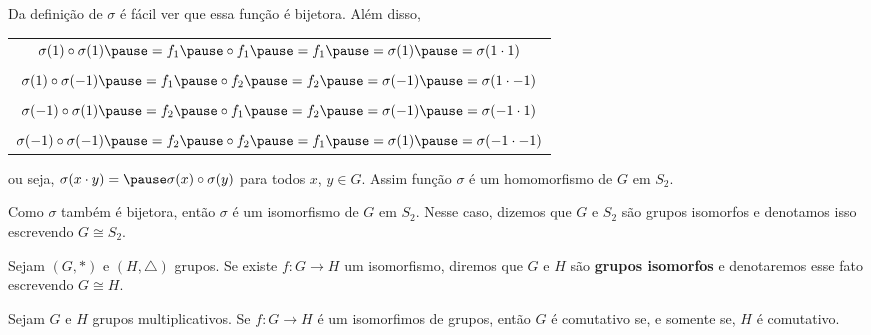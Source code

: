 \documentclass{beamer}
\begin{document}
    \begin{frame}
        Da definição de $\sigma$ \pause é fácil ver que essa função é bijetora. \pause Além disso, \pause
        \begin{center}
            \begin{tabular}{c}
                $\sigma(1) \circ \sigma(1) \pause = f_1 \pause \circ f_1 \pause = f_1 \pause = \sigma(1) \pause = \sigma(1 \cdot 1)$\pause\\
                \\
                $\sigma(1) \circ \sigma(-1) \pause = f_1 \pause \circ f_2 \pause = f_2 \pause = \sigma(-1) \pause = \sigma(1 \cdot -1)$ \pause\\
                \\
                $\sigma(-1) \circ \sigma(1) \pause = f_2 \pause \circ f_1 \pause = f_2 \pause = \sigma(-1) \pause = \sigma(-1 \cdot 1)$ \pause\\
                \\
                $\sigma(-1) \circ \sigma(-1) \pause = f_2 \pause \circ f_2 \pause = f_1 \pause = \sigma(1) \pause = \sigma(-1 \cdot -1)$ \pause\\
            \end{tabular}
        \end{center}
        ou seja, $\sigma(x\cdot y) = \pause \sigma(x) \circ \sigma(y)$ \pause para todos $x$, $y \in G$. \pause Assim função $\sigma$ é um homomorfismo de $G$ em $S_2$. \pause

        \vspace{.3cm}

        Como $\sigma$ também é bijetora, \pause então $\sigma$ é um isomorfismo \pause de $G$ em $S_2$. \pause Nesse caso, dizemos que $G$ e $S_2$ são grupos isomorfos \pause e denotamos isso escrevendo $G \cong S_2$.
    \end{frame}

    \begin{frame}
        \begin{definicao}
            Sejam $(G, *)$ e $(H, \triangle)$ grupos. \pause Se existe $f : G \to H$ um isomorfismo, \pause diremos que $G$ e $H$ são \textbf{grupos isomorfos} \pause e denotaremos esse fato escrevendo $G \cong H$. \pause
        \end{definicao}
    \end{frame}

    \begin{frame}
        \begin{proposicao}
            Sejam $G$ e $H$ grupos multiplicativos. \pause Se $f : G \to H$ é um isomorfimos de grupos, então \pause $G$ é comutativo se, e somente se, $H$ é comutativo. \pause
        \end{proposicao}
    \end{frame}
\end{document}
